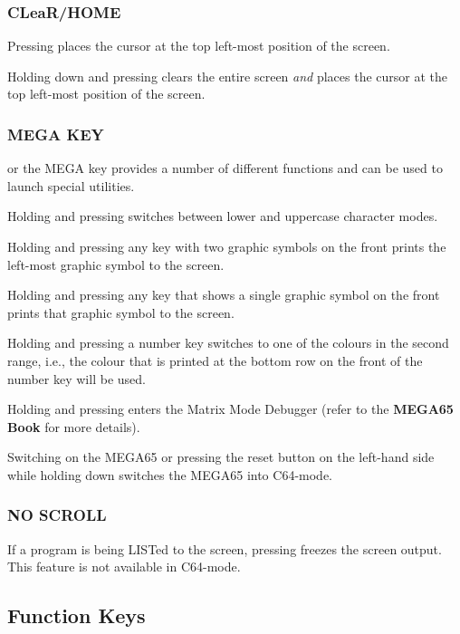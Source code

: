 \subsubsection{CLeaR/HOME}

Pressing  places the cursor at the top left-most position of the screen.

Holding down  and pressing  clears the entire screen {\it and} places the cursor at the top left-most position of the screen.

\subsubsection{MEGA KEY}

\megasymbolkey or the MEGA key provides a number of different functions and can be used to launch special utilities.

Holding  and pressing \megasymbolkey switches between lower and uppercase character modes.

Holding \megasymbolkey and pressing any key with two graphic symbols on the front prints the left-most graphic symbol to the screen.

Holding \megasymbolkey and pressing any key that shows a single graphic symbol on the front prints that graphic symbol to the screen.

Holding \megasymbolkey and pressing a number key switches to one of the colours in the second range, i.e., the colour that is printed at the bottom row on the front of the number key will be used.

Holding \megasymbolkey and pressing  enters the Matrix Mode Debugger (refer to the {\bf MEGA65 Book} for more details).

Switching on the MEGA65 or pressing the reset button on the left-hand side while holding down \megasymbolkey switches the MEGA65 into C64-mode.

\subsubsection{NO SCROLL}
If a program is being LISTed to the screen, pressing  freezes the screen output. This feature is not available in C64-mode.


\subsection{Function Keys}

